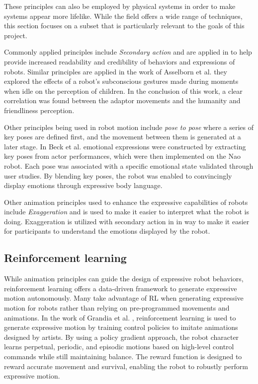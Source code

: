 These principles can also be employed by physical systems in order to make systems appear more lifelike. While the field offers a wide range of techniques, this section focuses on a subset that is particularly relevant to the goals of this project.

Commonly applied principles include \textit{Secondary action} and are applied in \cite{park_generation_2015} to help provide increased readability and credibility of behaviors and expressions of robots. Similar principles are applied in the work of Asselborn et al. \cite{asselborn_keep_2017} they explored the effects of a robot's subconscious gestures made during moments when idle on the perception of children. In the conclusion of this work, a clear correlation was found between the adaptor movements and the humanity and friendliness perception. 

Other principles being used in robot motion include \textit{pose to pose} where a series of key poses are defined first, and the movement between them is generated at a later stage. In Beck et al. \cite{beck_emotional_2012} emotional expressions were constructed by extracting key poses from actor performances, which were then implemented on the Nao robot. Each pose was associated with a specific emotional state validated through user studies. By blending key poses, the robot was enabled to convincingly display emotions through expressive body language.

Other animation principles used to enhance the expressive capabilities of robots include \textit{Exaggeration} and is used to make it easier to interpret what the robot is doing. Exaggeration is utilized with secondary action in \cite{park_generation_2015} in way to make it easier for participants to understand the emotions displayed by the robot.

 
\subsection{Reinforcement learning}
While animation principles can guide the design of expressive robot behaviors, reinforcement learning offers a data-driven framework to generate expressive motion autonomously. Many take advantage of RL when generating expressive motion for robots rather than relying on pre-programmed movements and animations. In the work of Grandia et al. \cite{grandia_design_2024}, reinforcement learning is used to generate expressive motion by training control policies to imitate animations designed by artists. By using a policy gradient approach, the robot character learns perpetual, periodic, and episodic motions based on high-level control commands while still maintaining balance. The reward function is designed to reward accurate movement and survival, enabling the robot to robustly perform expressive motion.
